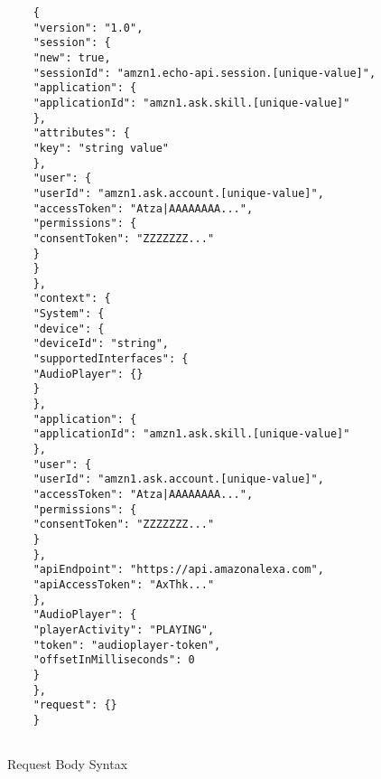 \begin{figure}[h]
	\caption[HTTPS Request Body]{Request Body Syntax}
	\label{jsonFromAlexa}
	\begin{verbatim}
	{
	"version": "1.0",
	"session": {
	"new": true,
	"sessionId": "amzn1.echo-api.session.[unique-value]",
	"application": {
	"applicationId": "amzn1.ask.skill.[unique-value]"
	},
	"attributes": {
	"key": "string value"
	},
	"user": {
	"userId": "amzn1.ask.account.[unique-value]",
	"accessToken": "Atza|AAAAAAAA...",
	"permissions": {
	"consentToken": "ZZZZZZZ..."
	}
	}
	},
	"context": {
	"System": {
	"device": {
	"deviceId": "string",
	"supportedInterfaces": {
	"AudioPlayer": {}
	}
	},
	"application": {
	"applicationId": "amzn1.ask.skill.[unique-value]"
	},
	"user": {
	"userId": "amzn1.ask.account.[unique-value]",
	"accessToken": "Atza|AAAAAAAA...",
	"permissions": {
	"consentToken": "ZZZZZZZ..."
	}
	},
	"apiEndpoint": "https://api.amazonalexa.com",
	"apiAccessToken": "AxThk..."
	},
	"AudioPlayer": {
	"playerActivity": "PLAYING",
	"token": "audioplayer-token",
	"offsetInMilliseconds": 0
	}
	},
	"request": {}
	}
	
	\end{verbatim}
\end{figure}







{}
